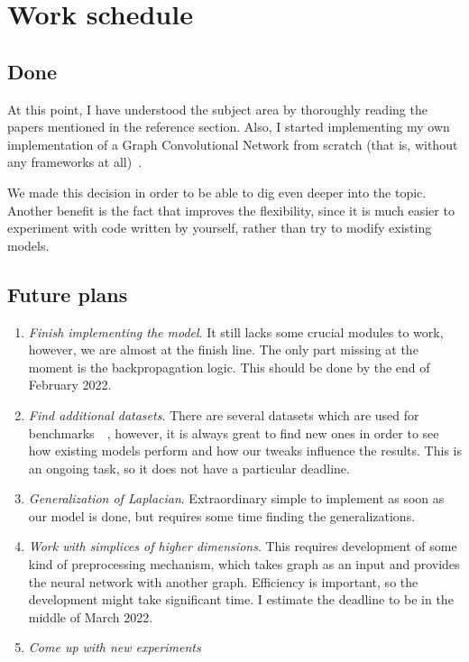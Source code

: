\section{Work schedule}

\subsection{Done}

    At this point, I have understood the subject area by thoroughly reading the papers mentioned in the reference section.
    Also, I started implementing my own implementation of a Graph Convolutional Network from scratch (that is, without any frameworks at all)~\cite{gcn_implementation}.

    We made this decision in order to be able to dig even deeper into the topic.
    Another benefit is the fact that improves the flexibility, since it is much easier to experiment with code written by yourself, rather than try to modify existing models.

\subsection{Future plans}

    \begin{enumerate}
        \item \textit{Finish implementing the model}.
            It still lacks some crucial modules to work, however, we are almost at the finish line.
            The only part missing at the moment is the backpropagation logic.
            This should be done by the end of February 2022.

        \item \textit{Find additional datasets}.
            There are several datasets which are used for benchmarks~\cite{cora_dataset}~\cite{karate_club_dataset}, however, it is always great to find new ones in order to see how existing models perform and how our tweaks influence the results.
            This is an ongoing task, so it does not have a particular deadline.

        \item \textit{Generalization of Laplacian}.
            Extraordinary simple to implement as soon as our model is done, but requires some time finding the generalizations.

        \item \textit{Work with simplices of higher dimensions}.
            This requires development of some kind of preprocessing mechanism, which takes graph as an input and provides the neural network with another graph.
            Efficiency is important, so the development might take significant time.
            I estimate the deadline to be in the middle of March 2022.
        
        \item \textit{Come up with new experiments}
    \end{enumerate}